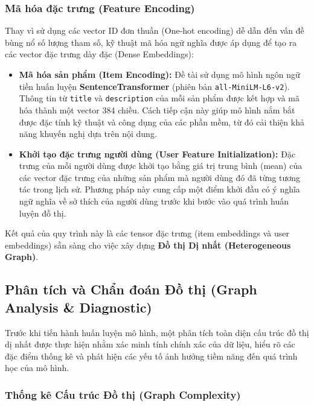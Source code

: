 \subsubsection{Mã hóa đặc trưng (Feature Encoding)}

Thay vì sử dụng các vector ID đơn thuần (One-hot encoding) dễ dẫn đến vấn đề bùng nổ số lượng tham số, kỹ thuật mã hóa ngữ nghĩa được áp dụng để tạo ra các vector đặc trưng dày đặc (Dense Embeddings):

\begin{itemize}
    \item \textbf{Mã hóa sản phẩm (Item Encoding):} Đề tài sử dụng mô hình ngôn ngữ tiền huấn luyện \textbf{SentenceTransformer} (phiên bản \texttt{all-MiniLM-L6-v2}). Thông tin từ \texttt{title} và \texttt{description} của mỗi sản phẩm được kết hợp và mã hóa thành một vector 384 chiều. Cách tiếp cận này giúp mô hình nắm bắt được đặc tính kỹ thuật và công dụng của các phần mềm, từ đó cải thiện khả năng khuyến nghị dựa trên nội dung.
    
    \item \textbf{Khởi tạo đặc trưng người dùng (User Feature Initialization):} Đặc trưng của mỗi người dùng được khởi tạo bằng giá trị trung bình (mean) của các vector đặc trưng của những sản phẩm mà người dùng đó đã từng tương tác trong lịch sử. Phương pháp này cung cấp một điểm khởi đầu có ý nghĩa ngữ nghĩa về sở thích của người dùng trước khi bước vào quá trình huấn luyện đồ thị.
\end{itemize}

Kết quả của quy trình này là các tensor đặc trưng (item embeddings và user embeddings) sẵn sàng cho việc xây dựng \textbf{Đồ thị Dị nhất (Heterogeneous Graph)}.

\subsection{Phân tích và Chẩn đoán Đồ thị (Graph Analysis \& Diagnostic)}

Trước khi tiến hành huấn luyện mô hình, một phân tích toàn diện cấu trúc đồ thị dị nhất được thực hiện nhằm xác minh tính chính xác của dữ liệu, hiểu rõ các đặc điểm thống kê và phát hiện các yếu tố ảnh hưởng tiềm năng đến quá trình học của mô hình.

\subsubsection{Thống kê Cấu trúc Đồ thị (Graph Complexity)}

